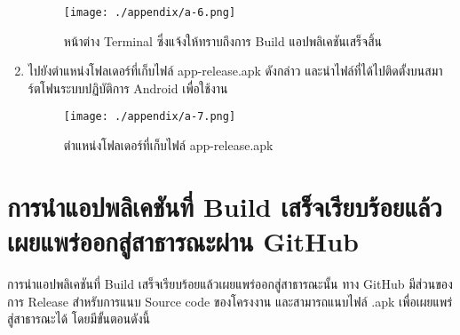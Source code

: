 \begin{enumerate}
    \begin{figure}
        \texttt{[image: ./appendix/a-6.png]}
        \caption{หน้าต่าง Terminal ซึ่งแจ้งให้ทราบถึงการ Build แอปพลิเคชันเสร็จสิ้น}
    \end{figure}
    \item ไปยังตำแหน่งโฟลเดอร์ที่เก็บไฟล์ app-release.apk ดังกล่าว และนำไฟล์ที่ได้ไปติดตั้งบนสมาร์ตโฟนระบบปฏิบัติการ Android เพื่อใช้งาน
    \begin{figure}
        \texttt{[image: ./appendix/a-7.png]}
        \caption{ตำแหน่งโฟลเดอร์ที่เก็บไฟล์ app-release.apk}
    \end{figure}
\end{enumerate}

\section{การนำแอปพลิเคชันที่ Build เสร็จเรียบร้อยแล้วเผยแพร่ออกสู่สาธารณะผ่าน GitHub}
การนำแอปพลิเคชันที่ Build เสร็จเรียบร้อยแล้วเผยแพร่ออกสู่สาธารณะนั้น ทาง GitHub มีส่วนของการ Release สำหรับการแนบ Source code ของโครงงาน และสามารถแนบไฟล์ .apk เพื่อเผยแพร่สู่สาธารณะได้ โดยมีขั้นตอนดังนี้

